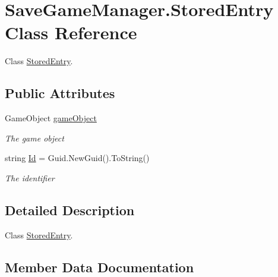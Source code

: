 \hypertarget{class_save_game_manager_1_1_stored_entry}{}\section{Save\+Game\+Manager.\+Stored\+Entry Class Reference}
\label{class_save_game_manager_1_1_stored_entry}


Class \hyperlink{class_save_game_manager_1_1_stored_entry}{Stored\+Entry}.  


\subsection*{Public Attributes}
\begin{DoxyCompactItemize}
\item 
Game\+Object \hyperlink{class_save_game_manager_1_1_stored_entry_a67b3211b5145ae167bf5cfa817f4894f}{game\+Object}
\begin{DoxyCompactList}\small\item\em The game object \end{DoxyCompactList}\item 
string \hyperlink{class_save_game_manager_1_1_stored_entry_ae7208d742a7ac6d0fce5e5af39330e0c}{Id} = Guid.\+New\+Guid().To\+String()
\begin{DoxyCompactList}\small\item\em The identifier \end{DoxyCompactList}\end{DoxyCompactItemize}


\subsection{Detailed Description}
Class \hyperlink{class_save_game_manager_1_1_stored_entry}{Stored\+Entry}. 



\subsection{Member Data Documentation}
\mbox{\label{class_save_game_manager_1_1_stored_entry_a67b3211b5145ae167bf5cfa817f4894f}} 
